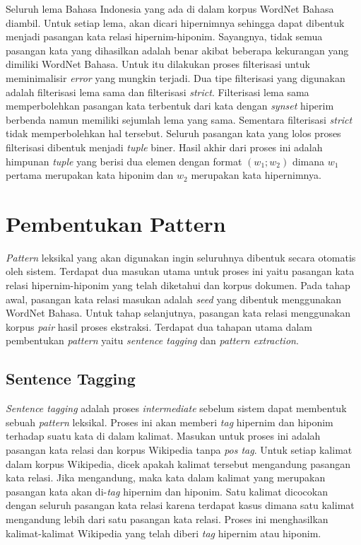 Seluruh lema Bahasa Indonesia yang ada di dalam korpus WordNet Bahasa diambil. Untuk setiap lema, akan dicari hipernimnya sehingga dapat dibentuk menjadi pasangan kata relasi hipernim-hiponim. Sayangnya, tidak semua pasangan kata yang dihasilkan adalah benar akibat beberapa kekurangan yang dimiliki WordNet Bahasa. Untuk itu dilakukan proses filterisasi untuk meminimalisir \textit{error} yang mungkin terjadi. Dua tipe filterisasi yang digunakan adalah filterisasi lema sama dan filterisasi \textit{strict}. Filterisasi lema sama memperbolehkan pasangan kata terbentuk dari kata dengan \textit{synset} hiperim berbenda namun memiliki sejumlah lema yang sama. Sementara filterisasi \textit{strict} tidak memperbolehkan hal tersebut. Seluruh pasangan kata yang lolos proses filterisasi dibentuk menjadi \textit{tuple} biner. Hasil akhir dari proses ini adalah himpunan \textit{tuple} yang berisi dua elemen dengan format $(w_1;w_2)$ dimana $w_1$ pertama merupakan kata hiponim dan $w_2$ merupakan kata hipernimnya.


\section{Pembentukan Pattern}
\textit{Pattern} leksikal yang akan digunakan ingin seluruhnya dibentuk secara otomatis oleh sistem. Terdapat dua masukan utama untuk proses ini yaitu pasangan kata relasi hipernim-hiponim yang telah diketahui dan korpus dokumen. Pada tahap awal, pasangan kata relasi masukan adalah \textit{seed} yang dibentuk menggunakan WordNet Bahasa. Untuk tahap selanjutnya, pasangan kata relasi menggunakan korpus \textit{pair} hasil proses ekstraksi. Terdapat dua tahapan utama dalam pembentukan \textit{pattern} yaitu \textit{sentence tagging} dan \textit{pattern extraction}.

\subsection{Sentence Tagging}
\textit{Sentence tagging} adalah proses \textit{intermediate} sebelum sistem dapat membentuk sebuah \textit{pattern} leksikal. Proses ini akan memberi \textit{tag} hipernim dan hiponim terhadap suatu kata di dalam kalimat. Masukan untuk proses ini adalah pasangan kata relasi dan korpus Wikipedia tanpa \textit{pos tag}. Untuk setiap kalimat dalam korpus Wikipedia, dicek apakah kalimat tersebut mengandung pasangan kata relasi. Jika mengandung, maka kata dalam kalimat yang merupakan pasangan kata akan di-\textit{tag} hipernim dan hiponim. Satu kalimat dicocokan dengan seluruh pasangan kata relasi karena terdapat kasus dimana satu kalimat mengandung lebih dari satu pasangan kata relasi. Proses ini menghasilkan kalimat-kalimat Wikipedia yang telah diberi \textit{tag} hipernim atau hiponim.

